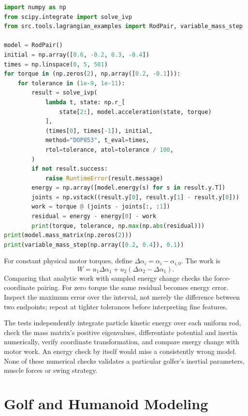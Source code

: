 \begin{lstlisting}[language=Python,basicstyle=\ttfamily\small]
import numpy as np
from scipy.integrate import solve_ivp
from src.tools.lagrangian_examples import RodPair, variable_mass_step

model = RodPair()
initial = np.array([0.6, -0.2, 0.3, -0.4])
times = np.linspace(0, 5, 501)
for torque in (np.zeros(2), np.array([0.2, -0.1])):
    for tolerance in (1e-9, 1e-11):
        result = solve_ivp(
            lambda t, state: np.r_[
                state[2:], model.acceleration(state, torque)
            ],
            (times[0], times[-1]), initial,
            method="DOP853", t_eval=times,
            rtol=tolerance, atol=tolerance / 100,
        )
        if not result.success:
            raise RuntimeError(result.message)
        energy = np.array([model.energy(s) for s in result.y.T])
        joints = np.vstack((result.y[0], result.y[1] - result.y[0]))
        work = torque @ (joints - joints[:, :1])
        residual = energy - energy[0] - work
        print(torque, tolerance, np.max(np.abs(residual)))
print(model.mass_matrix(np.zeros(2)))
print(variable_mass_step(np.array([0.2, 0.4]), 0.1))
\end{lstlisting}

For constant physical motor torques, define $\Delta\alpha_i=\alpha_i-\alpha_{i,0}$. The work is
\begin{equation}
W=u_1\Delta\alpha_1+u_2(\Delta\alpha_2-\Delta\alpha_1).
\label{eq:lagrangian_motor_work}
\end{equation} Comparing that analytic work with sampled energy change checks the force-coordinate pairing. For zero torque the same residual becomes energy error. Inspect the maximum error over the interval, not merely the difference between two endpoints; repeat at tighter tolerances before interpreting fine features.

The tests independently integrate particle kinetic energy over each uniform rod, check the mass matrix's positive eigenvalues, differentiate potential and inertia numerically, verify coordinate transformation, and compare energy change with motor work. An energy check by itself would miss a consistently wrong model. None of these numerical checks validates a particular golfer's inertial parameters, muscle forces or swing strategy.

\section{Golf and Humanoid Modeling}
\label{sec:lagrangian_golf}

